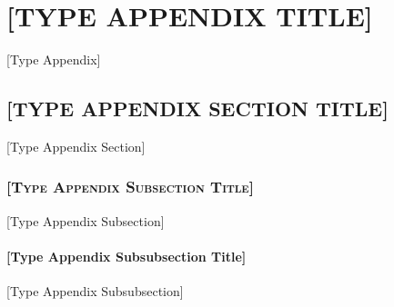 \chapter{\uppercase{[Type Appendix Title]}}
[Type Appendix]
\section{\uppercase{[Type Appendix Section Title]}}
[Type Appendix Section]
\subsection{\textsc{[Type Appendix Subsection Title]}}
[Type Appendix Subsection]
\subsubsection{[Type Appendix Subsubsection Title]}
[Type Appendix Subsubsection]